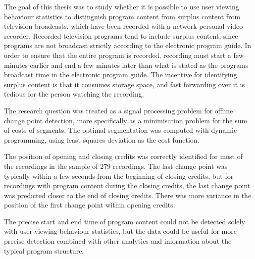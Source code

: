 %
%

\begin{enabstract}

The goal of this thesis was to study whether it is possible to use user viewing behaviour statistics to distinguish program content from surplus content from television broadcasts, which have been recorded with a network personal video recorder. Recorded television programs tend to include surplus content, since programs are not broadcast strictly according to the electronic program guide. In order to ensure that the entire program is recorded, recording must start a few minutes earlier and end a few minutes later than what is stated as the programs broadcast time in the electronic program guide. The incentive for identifying surplus content is that it consumes storage space, and fast forwarding over it is tedious for the person watching the recording.

The research question was treated as a signal processing problem for offline change point detection, more specifically as a minimisation problem for the sum of costs of segments. %
The optimal segmentation was computed with dynamic programming, using least squares deviation as the cost function.

The position of opening and closing credits was correctly identified for most of the recordings in the sample of 279 recordings. The last change point was typically within a few seconds from the beginning of closing credits, but for recordings with program content during the closing credits, the last change point was predicted closer to the end of closing credits. There was more variance in the position of the first change point within opening credits.

The precise start and end time of program content could not be detected solely with user viewing behaviour statistics, but the data could be useful for more precise detection combined with other analytics and information about the typical program structure.

\end{enabstract}


